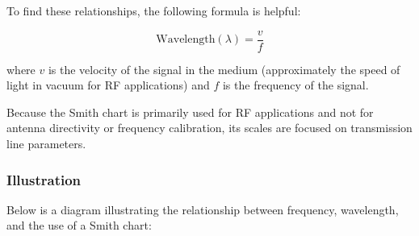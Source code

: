 To find these relationships, the following formula is helpful:

\[
\text{Wavelength} (\lambda) = \frac{v}{f}
\]

where \( v \) is the velocity of the signal in the medium (approximately the speed of light in vacuum for RF applications) and \( f \) is the frequency of the signal. 

Because the Smith chart is primarily used for RF applications and not for antenna directivity or frequency calibration, its scales are focused on transmission line parameters.

\subsubsection*{Illustration}

Below is a diagram illustrating the relationship between frequency, wavelength, and the use of a Smith chart:

\begin{center}
\end{center}
